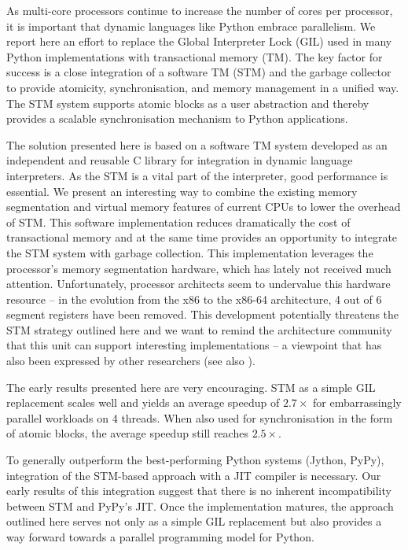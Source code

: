 \documentclass{sigplanconf}
\begin{document}
As multi-core processors continue to increase the number of cores per
processor, it is important that dynamic languages like Python embrace
parallelism.  We report here an effort to replace the Global
Interpreter Lock (GIL) used in many Python implementations with
transactional memory (TM). The key factor for success is a close
integration of a software TM (STM) and the garbage collector to
provide atomicity, synchronisation, and memory management in a unified
way.  The STM system supports atomic blocks as a user abstraction and
thereby provides a scalable synchronisation mechanism to Python
applications.


The solution presented here is based on a software TM system developed
as an independent and reusable C library for integration in dynamic
language interpreters. As the 
STM is a vital part of the interpreter, good performance is
essential. We present an interesting way to combine the existing
memory segmentation and virtual memory features of current CPUs to
lower the overhead of STM. This software implementation reduces
dramatically the cost of transactional memory and at the same time
provides an opportunity to integrate the STM system with garbage
collection.  This implementation leverages the processor's memory
segmentation hardware, which has lately not received much attention.
Unfortunately, processor architects seem to
undervalue this hardware resource -- in the evolution from the x86 to
the x86{-}64 architecture, 4 out of 6 segment registers have been
removed. This development potentially threatens the STM strategy
outlined here and we want to remind the architecture community that
this unit can support interesting implementations -- a viewpoint that
has also been expressed by other researchers (see also
\cite{bennet10}).

The early results presented here are very encouraging. STM as a simple
GIL replacement scales well and yields an average speedup of $2.7\times$ for
embarrassingly parallel workloads on 4 threads.  When also used for
synchronisation in the form of atomic blocks, the average speedup
still reaches $2.5\times$.

To generally outperform the best-performing Python systems (Jython,
PyPy), integration of the STM-based approach with a JIT compiler is
necessary. Our early results of this integration suggest that there is
no inherent incompatibility between STM and PyPy's JIT.  Once the
implementation matures, the approach outlined here serves not only as a
simple GIL replacement but also provides a way forward towards a
parallel programming model for Python.
\end{document}
